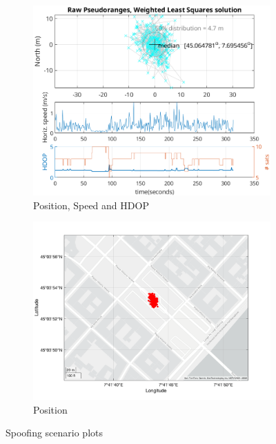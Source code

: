 \begin{figure}[h!]
\begin{subfigure}{0.22\textwidth}
                \includegraphics[width=\textwidth]{images/tests/Monte_Cappuccini/Spoofing/task5_figures/Samsung_A51_Monte_Cappuccini_fig4.png}
                \caption{Position, Speed and HDOP}
                \label{fig:Spoofed_c}
            \end{subfigure}
            \hfill
            \begin{subfigure}{0.23\textwidth}
                \vspace{0.40cm}
                \includegraphics[width=\textwidth]{images/tests/Monte_Cappuccini/Spoofing/task5_figures/Samsung_A51_Monte_Cappuccini_fig6.png}
                \caption{Position}
                \label{fig:Spoofed_d}
            \end{subfigure}
            \vspace{0.35cm}
            \caption{Spoofing scenario plots}
            \label{fig:spoofed_plots}
        \end{figure}
        
